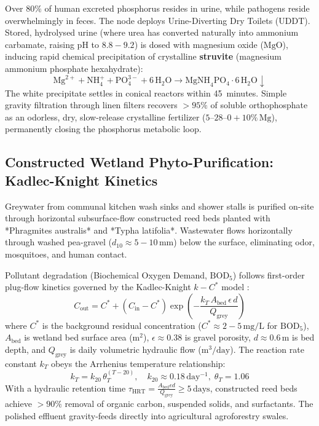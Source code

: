 Over $80\%$ of human excreted phosphorus resides in urine, while pathogens reside overwhelmingly in feces. The node deploys Urine-Diverting Dry Toilets (UDDT). Stored, hydrolysed urine (where urea has converted naturally into ammonium carbamate, raising $\mathrm{pH}$ to $8.8 - 9.2$) is dosed with magnesium oxide ($\mathrm{MgO}$), inducing rapid chemical precipitation of crystalline \textbf{struvite} (magnesium ammonium phosphate hexahydrate):
\begin{equation}
\mathrm{Mg}^{2+} + \mathrm{NH}_4^+ + \mathrm{PO}_4^{3-} + 6\,\mathrm{H}_2\mathrm{O} \to \mathrm{MgNH}_4\mathrm{PO}_4 \cdot 6\,\mathrm{H}_2\mathrm{O} \downarrow
\label{eq:struvite_reaction}
\end{equation}
The white precipitate settles in conical reactors within 45~minutes. Simple gravity filtration through linen filters recovers $>95\%$ of soluble orthophosphate as an odorless, dry, slow-release crystalline fertilizer ($5\text{--}28\text{--}0 + 10\%\,\mathrm{Mg}$), permanently closing the phosphorus metabolic loop.

\subsection{Constructed Wetland Phyto-Purification: Kadlec-Knight Kinetics}
Greywater from communal kitchen wash sinks and shower stalls is purified on-site through horizontal subsurface-flow constructed reed beds planted with *Phragmites australis* and *Typha latifolia*. Wastewater flows horizontally through washed pea-gravel ($d_{10} \approx 5 - 10\,\mathrm{mm}$) below the surface, eliminating odor, mosquitoes, and human contact.

Pollutant degradation (Biochemical Oxygen Demand, $\mathrm{BOD}_5$) follows first-order plug-flow kinetics governed by the Kadlec-Knight $k-C^*$ model \cite{kadlec2008}:
\begin{equation}
C_{\mathrm{out}} = C^* + (C_{\mathrm{in}} - C^*) \exp\left( -\frac{k_T \, A_{\mathrm{bed}} \, \epsilon \, d}{Q_{\mathrm{grey}}} \right)
\label{eq:kadlec_knight_eco}
\end{equation}
where $C^*$ is the background residual concentration ($C^* \approx 2 - 5\,\mathrm{mg/L}$ for $\mathrm{BOD}_5$), $A_{\mathrm{bed}}$ is wetland bed surface area ($\mathrm{m^2}$), $\epsilon \approx 0.38$ is gravel porosity, $d \approx 0.6\,\mathrm{m}$ is bed depth, and $Q_{\mathrm{grey}}$ is daily volumetric hydraulic flow ($\mathrm{m^3/day}$). The reaction rate constant $k_T$ obeys the Arrhenius temperature relationship:
\begin{equation}
k_T = k_{20} \, \theta_T^{(T - 20)}, \quad k_{20} \approx 0.18\,\mathrm{day^{-1}}, \; \theta_T = 1.06
\label{eq:arrhenius_wetland_eco}
\end{equation}
With a hydraulic retention time $\tau_{\mathrm{HRT}} = \frac{A_{\mathrm{bed}} \epsilon d}{Q_{\mathrm{grey}}} \ge 5\,\mathrm{days}$, constructed reed beds achieve $>90\%$ removal of organic carbon, suspended solids, and surfactants. The polished effluent gravity-feeds directly into agricultural agroforestry swales.

